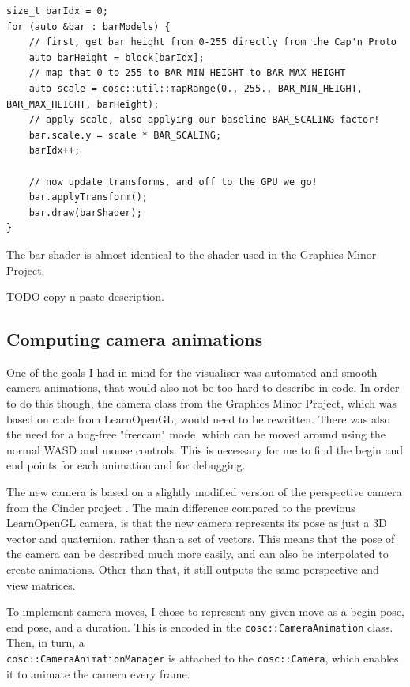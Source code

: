\documentclass[11pt]{article}
\begin{document}
\begin{verbatim}
size_t barIdx = 0;
for (auto &bar : barModels) {
    // first, get bar height from 0-255 directly from the Cap'n Proto
    auto barHeight = block[barIdx];
    // map that 0 to 255 to BAR_MIN_HEIGHT to BAR_MAX_HEIGHT
    auto scale = cosc::util::mapRange(0., 255., BAR_MIN_HEIGHT, BAR_MAX_HEIGHT, barHeight);
    // apply scale, also applying our baseline BAR_SCALING factor!
    bar.scale.y = scale * BAR_SCALING;
    barIdx++;

    // now update transforms, and off to the GPU we go!
    bar.applyTransform();
    bar.draw(barShader);
}
\end{verbatim}

The bar shader is almost identical to the shader used in the Graphics Minor Project.

TODO copy n paste description.

\subsection{Computing camera animations}
One of the goals I had in mind for the visualiser was automated and smooth camera animations, that would also
not be too hard to describe in code. In order to do this though, the camera class from the Graphics Minor
Project, which was based on code from LearnOpenGL, would need to be rewritten. There was also the need for a
bug-free "freecam" mode, which can be moved around using the normal WASD and mouse controls. This is necessary
for me to find the begin and end points for each animation and for debugging.

The new camera is based on a slightly modified version of the perspective camera from the Cinder project
\cite{cinderCamera}. The main difference compared to the previous LearnOpenGL camera, is that the new camera
represents its pose as just a 3D vector and quaternion, rather than a set of vectors. This means that the pose
of the camera can be described much more easily, and can also be interpolated to create animations. Other than
that, it still outputs the same perspective and view matrices.

To implement camera moves, I chose to represent any given move as a begin pose, end pose, and a duration. This
is encoded in the \verb|cosc::CameraAnimation| class. Then, in turn, a \\ \verb|cosc::CameraAnimationManager| is
attached to the \verb|cosc::Camera|, which enables it to animate the camera every frame.
\end{document}
